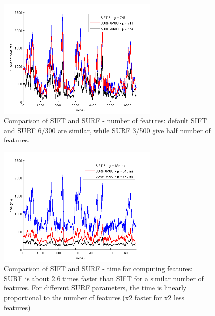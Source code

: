 \begin{figure}[H]
\begin{center}
\includegraphics[width=0.7\textwidth]{figures/stats_features_nb}
\caption{Comparison of SIFT and SURF - number of features: default SIFT and SURF 6/300 are similar, while SURF 3/500 give half number of features.}
\end{center}
\end{figure}

\begin{figure}[H]
\begin{center}
\includegraphics[width=0.7\textwidth]{figures/stats_features_time}
\caption{Comparison of SIFT and SURF - time for computing features: SURF is about 2.6 times faster than SIFT for a similar number of features. For different SURF parameters, the time is linearly proportional to the number of features (x2 faster for x2 less features).}
\end{center}
\end{figure}

